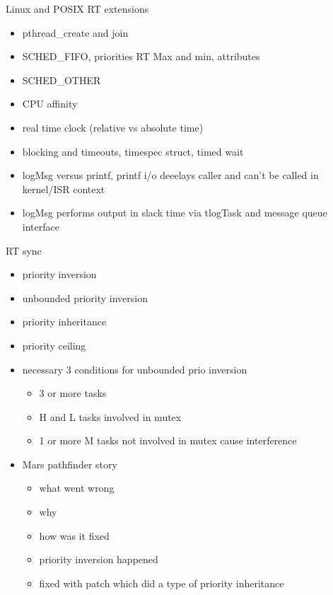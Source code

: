 \documentclass{article}
\begin{document}
Linux and POSIX RT extensions
\begin{itemize}
    \item pthread\_create and join
    \item SCHED\_FIFO, priorities RT Max and min, attributes
    \item SCHED\_OTHER
    \item CPU affinity
    \item real time clock (relative vs absolute time)
    \item blocking and timeouts, timespec struct, timed wait
    \item logMsg versus printf, printf i/o deeelays caller and can't be called in kernel/ISR context
    \item logMsg performs output in slack time via tlogTask and message queue interface
\end{itemize}

RT sync
\begin{itemize}
    \item priority inversion
    \item unbounded priority inversion
    \item priority inheritance
    \item priority ceiling
    \item necessary 3 conditions for unbounded prio inversion
        \begin{itemize}
            \item 3 or more tasks
            \item H and L tasks involved in mutex
            \item 1 or more M tasks not involved in mutex cause interference
        \end{itemize}
    \item Mars pathfinder story
        \begin{itemize}
            \item what went wrong
            \item why
            \item how was it fixed
            \item priority inversion happened
            \item fixed with patch which did a type of priority inheritance
        \end{itemize}
\end{itemize}
\end{document}
